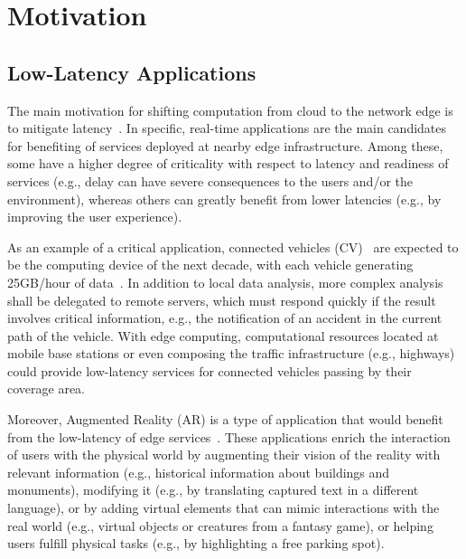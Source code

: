 \section{Motivation}\label{sec:motivation}
%

\subsection{Low-Latency Applications}

The main motivation for shifting computation from cloud to the network edge is to mitigate latency~\cite{Bonomi2014}. In specific, real-time applications are the main candidates for benefiting of services deployed at nearby edge infrastructure. Among these, some have a higher degree of criticality with respect to latency and readiness of services (e.g., delay can have severe consequences to the users and/or the environment), whereas others can greatly benefit from lower latencies (e.g., by improving the user experience).

As an example of a critical application, connected vehicles (CV)~\cite{Bonomi:2012} are expected to be the computing device of the next decade, with each vehicle generating 25GB/hour of data~\cite{HitachiInternetOnWheels16}. In addition to local data analysis, more complex analysis shall be delegated to remote servers, which must respond quickly if the result involves critical information, e.g., the notification of an accident in the current path of the vehicle. With edge computing, computational resources located at mobile base stations or even composing the traffic infrastructure (e.g., highways) could provide low-latency services for connected vehicles passing by their coverage area.

Moreover, Augmented Reality (AR) is a type of application that would benefit from the low-latency of edge services~\cite{hu2015mobile,GarrigaMendonca2017}. These applications enrich the interaction of users with the physical
world by augmenting their vision of the reality with relevant information (e.g., historical information about buildings and monuments), modifying it (e.g., by translating captured text in a different language), or by adding virtual elements that can mimic interactions with the real world (e.g., virtual objects or creatures
from a fantasy game), or helping users fulfill physical tasks (e.g., by highlighting a free parking spot).

